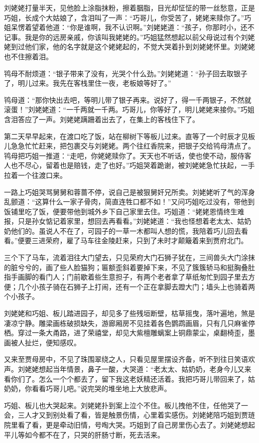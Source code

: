 \documentclass[12pt,oneside]{book}
\begin{document}
刘姥姥打量半天，见他脸上涂脂抹粉，擦着胭脂，目光却怔怔的带一丝愁意，正是巧姐，长成个大姑娘了，含泪叫了一声：“巧哥儿，你受苦了，姥姥来赎你了。”巧姐呆愣着望着他道：“你是谁啊，我不认识啊。”刘姥姥道：“孩子，你那时小，还不记事。我是你的远房亲戚，你该叫我姥姥的。”巧姐猛然想起以前父母说过有个刘姥姥到过他们家，他的名字就是这个姥姥起的，不觉大哭着扑到刘姥姥怀里。刘姥姥也不住擦着泪。

鸨母不耐烦道：“银子带来了没有，光哭个什么劲。”刘姥姥道：“孙子回去取银子了，明儿过来。我先在客栈里住一夜，老板娘等好了。”

鸨母道：“那你快出去吧，等明儿带了银子再来。说好了，得一千两银子，不然就滚蛋！”刘姥姥道：“一千两就一千两。巧哥儿，你等好了，明儿姥姥来接你。”巧姐含泪答应了一声。刘姥姥蹒跚着出去了，在集上的客栈住下了。

第二天早早起来，在渡口吃了饭，站在柳树下等板儿过来。直等了一个时辰才见板儿急急忙忙赶来，把包裹交与刘姥姥。两个往红香院来，把银子交给鸨母清点了。鸨母把巧姐一推道：“走吧，你姥姥赎你了。天天也不听话，使也使不动，服侍客人也不尽心，留着也是赔钱，走了也好。”巧姐哭着跪谢，被刘姥姥急忙扶起，一手拉着一个往渡口来。

一路上巧姐哭骂舅舅和蓉蔷不停，说自己是被狠舅奸兄所卖。刘姥姥听了气的浑身乱颤道：“这算什么一家子骨肉，简直连牲口都不如！”又问巧姐吃过没有，带他到饭铺里吃了饭，便要带他到城外乡下自己家里去住。巧姐道：“姥姥恩情终生难报，只是孙女惦记着家里，想回去再看看。”刘姥姥道：“我也怪想着老太太、姑奶奶他们的。虽说人不在了，可园子的一草一木都叫人想的慌，我陪着巧儿回去看看。”便要三进荣府，雇了马车往金陵赶来，只到了未时才颠簸着来到贾府北门。

三个下了马车，流着泪往大门望去，只见荣府大门石狮子犹在，三间兽头大门涂抹的脏兮兮的，画了些人脸猫狗；匾额歪斜着要掉下来，不见了簇簇轿马和挺胸叠肚指手画脚的看门人；门前歇着些生意担子，有两个老者拿了草纸匆忙到园子里去方便；几个小孩子骑在石狮子上打闹，还有一个正在拿脚去蹬大门；墙头上也骑着两个小孩子。

刘姥姥和巧姐、板儿踏进园子，却见多了些残垣断壁，枯草摇曳，落叶遍地，煞是凄凉宁静。雕梁画栋破损缺失，游廊厢房不见挂着各色鹦鹉画眉，只有几只麻雀停栖。穿过一条大甬路，进了荣禧堂，却见大紫檀雕螭案上铜鼎蒙尘，桌翻椅歪，墨画被人扯烂，便知感叹。

又来至贾母房中，不见了珠围翠绕之人，只看见屋里摆设齐备，听不到往日笑语欢声。刘姥姥想起当年情景，鼻子一酸，大哭道：“老太太、姑奶奶，老身今儿又来看你们了。怎么一个个都去了，留下我这老妖精还活着。我把巧哥儿带回来了，姑奶奶，你看看巧哥儿吧。”说完哭的堆坐地上大放悲声。

巧姐、板儿也大哭起来。刘姥姥扑到案上泣个不住。板儿拽他不住，任他哭了一会，三人才又到别处看了看，皆是触景伤情，心里着实感伤。刘姥姥陪巧姐到贾琏院里看了看，更是牵动旧情，号啕大哭。巧姐到了自己房里伤心去了。刘姥姥想起平儿等如今都不在了，只哭的肝肠寸断，死去活来。
\end{document}
